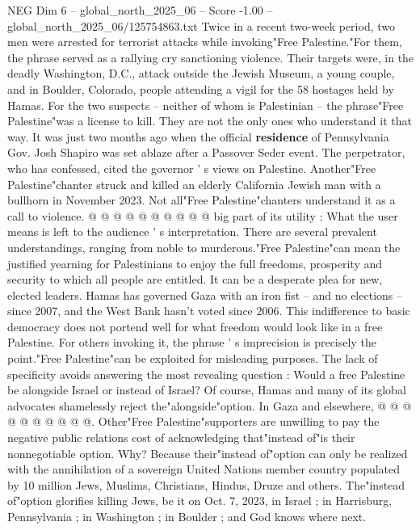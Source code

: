 \begin{textsample}{NEG Dim 6 – global\_north\_2025\_06 – Score -1.00 – global\_north\_2025\_06/125754863.txt}  \label{ex:f6_neg_433}
Twice in a recent two-week period, two men were arrested for terrorist attacks while invoking"Free Palestine."For them, the phrase served as a rallying cry sanctioning violence.
Their targets were, in the deadly Washington, D.C., attack outside the Jewish Museum, a young couple, and in Boulder, Colorado, people attending a vigil for the 58 hostages held by Hamas.
For the two suspects -- neither of whom is Palestinian -- the phrase"Free Palestine"was a license to kill.
They are not the only ones who understand it that way.
It was just two months ago when the official \textbf{residence} of Pennsylvania Gov.
Josh Shapiro was set ablaze after a Passover Seder event.
The perpetrator, who has confessed, cited the governor ' s views on Palestine.
Another"Free Palestine"chanter struck and killed an elderly California Jewish man with a bullhorn in November 2023.
Not all"Free Palestine"chanters understand it as a call to violence. @ @ @ @ @ @ @ @ @ @ big part of its utility : What the user means is left to the audience ' s interpretation.
There are several prevalent understandings, ranging from noble to murderous."Free Palestine"can mean the justified yearning for Palestinians to enjoy the full freedoms, prosperity and security to which all people are entitled.
It can be a desperate plea for new, elected leaders.
Hamas has governed Gaza with an iron fist -- and no elections -- since 2007, and the West Bank hasn't voted since 2006.
This indifference to basic democracy does not portend well for what freedom would look like in a free Palestine.
For others invoking it, the phrase ' s imprecision is precisely the point."Free Palestine"can be exploited for misleading purposes.
The lack of specificity avoids answering the most revealing question : Would a free Palestine be alongside Israel or instead of Israel?
Of course, Hamas and many of its global advocates shamelessly reject the"alongside"option.
In Gaza and elsewhere, @ @ @ @ @ @ @ @ @ @.
Other"Free Palestine"supporters are unwilling to pay the negative public relations cost of acknowledging that"instead of"is their nonnegotiable option.
Why?
Because their"instead of"option can only be realized with the annihilation of a sovereign United Nations member country populated by 10 million Jews, Muslims, Christians, Hindus, Druze and others.
The"instead of"option glorifies killing Jews, be it on Oct. 7, 2023, in Israel ; in Harrisburg, Pennsylvania ; in Washington ; in Boulder ; and God knows where next.

\end{textsample}
